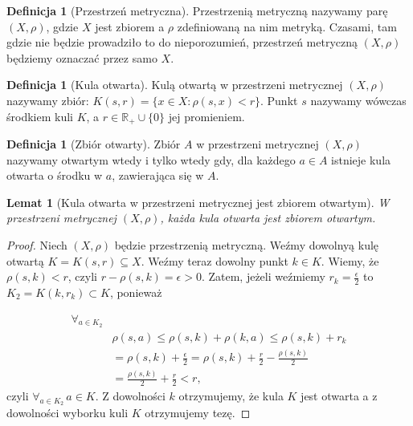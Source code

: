 \documentclass[licencjacka]{pwr_wmat_praca_dyplomowa}
\theoremstyle{plain}
\numberwithin{theorem}{chapter}
\newtheorem{lemma}[theorem]{Lemat}
\theoremstyle{definition}
\numberwithin{theorem}{chapter}
\newtheorem{definition}[theorem]{Definicja}
\begin{document}
\begin{definition}[Przestrzeń metryczna]
Przestrzenią metryczną nazywamy parę $(X, \rho)$, gdzie $X$ jest zbiorem a $\rho$ zdefiniowaną na nim metryką. Czasami, tam gdzie nie będzie prowadziło to do nieporozumień, przestrzeń metryczną $(X, \rho)$ będziemy oznaczać przez samo $X$.
\end{definition}

\begin{definition}[Kula otwarta]
Kulą otwartą w przestrzeni metrycznej $(X, \rho)$ nazywamy zbiór: $K(s, r) = \{x \in X: \rho(s, x) < r\}$.
Punkt $s$ nazywamy wówczas środkiem kuli $K$, a $r \in \mathbb{R}_+ \cup \{0\}$ jej promieniem.
\end{definition}

\begin{definition}[Zbiór otwarty]
Zbiór $A$ w przestrzeni metrycznej $(X, \rho)$ nazywamy otwartym wtedy i tylko wtedy gdy, dla każdego $a \in A$ istnieje kula otwarta o środku w $a$, zawierająca się w $A$.
\end{definition}

\begin{lemma}[Kula otwarta w przestrzeni metrycznej jest zbiorem otwartym]\label{kula_otwarta_jest_zbiorem_otwartym}
W przestrzeni metrycznej $(X, \rho)$, każda kula otwarta jest zbiorem otwartym.
\end{lemma}

\begin{proof}
Niech $(X, \rho)$ będzie przestrzenią metryczną. Weźmy dowolnyą kulę otwartą $K = K(s, r) \subseteq X$. Weźmy teraz dowolny punkt $k \in K$. Wiemy, że $\rho(s, k) < r$, czyli $r - \rho(s, k) = \epsilon > 0$. Zatem, jeżeli weźmiemy $r_k = \frac{\epsilon}{2}$ to $K_2 = K(k, r_k) \subset K$, ponieważ 

\begin{equation}
\begin{aligned}
\forall_{a \in K_2} \\
& \rho(s, a) \leq \rho(s, k) + \rho(k, a) \leq \rho(s, k) + r_k \\
& = \rho(s, k) + \frac{\epsilon}{2} = \rho(s, k) + \frac{r}{2} - \frac{\rho(s, k)}{2} \\
& = \frac{\rho(s, k)}{2} + \frac{r}{2} < r,
\end{aligned}
\end{equation}
czyli $\forall_{a \in K_2} \, a \in K.$ Z dowolności $k$ otrzymujemy, że kula $K$ jest otwarta a z dowolności wyborku kuli $K$ otrzymujemy tezę.
\end{proof}
\end{document}
